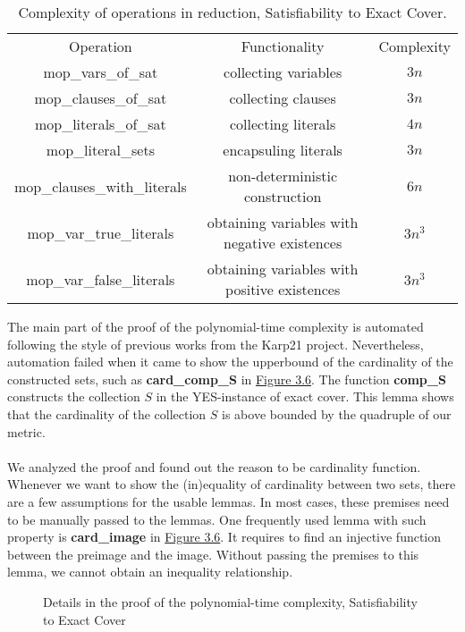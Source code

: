 \begin{table}[!h]
    \centering 
    \begin{tabular}{| c | c | c |}
        \hline 
        Operation & Functionality & Complexity \\ 
        \hhline{|=|=|=|}
        mop\_vars\_of\_sat & collecting variables & $3n$ \\ 
        \hline 
        mop\_clauses\_of\_sat & collecting clauses & $3n$ \\ 
        \hline 
        mop\_literals\_of\_sat & collecting literals & $4n$ \\ 
        \hline 
        mop\_literal\_sets & encapsuling literals & $3n$ \\
        \hline 
        mop\_clauses\_with\_literals & non-deterministic construction & $6n$ \\ 
        \hline 
        mop\_var\_true\_literals & obtaining variables with negative existences & $3n^3$ \\ 
        \hline
        mop\_var\_false\_literals & obtaining variables with positive existences & $3n^3$ \\ 
        \hline
    \end{tabular}
    \caption{Complexity of operations in reduction, Satisfiability to Exact Cover.}
    \label{table:3.1}
\end{table}
The main part of the proof of the polynomial-time complexity is automated following 
the style of previous works from the Karp21 project. 
Nevertheless, automation failed 
when it came to show the upperbound of the cardinality of the constructed sets, such as 
\textbf{card\_comp\_S} in \hyperref[fig:3.6]{Figure 3.6}. The function \textbf{comp\_S}
constructs the collection $S$ in the YES-instance of exact cover. This lemma shows that 
the cardinality of the collection $S$ is above bounded by the quadruple of our metric.
\\\\
We analyzed the proof and found out the reason to be cardinality function. 
Whenever we want to show the (in)equality of cardinality between two sets, there are a few assumptions 
for the usable lemmas.
In most cases, these premises need to be manually passed to the lemmas. One frequently used lemma 
with such property is \textbf{card\_image} in \hyperref[fig:3.6]{Figure 3.6}. It requires to find 
an injective function between the preimage and the image. 
Without passing the premises to this lemma, we cannot obtain an inequality relationship.
\begin{figure}
    \centering
    \caption{Details in the proof of the polynomial-time complexity, Satisfiability to Exact Cover}
    \label{fig:3.6}
\end{figure}

